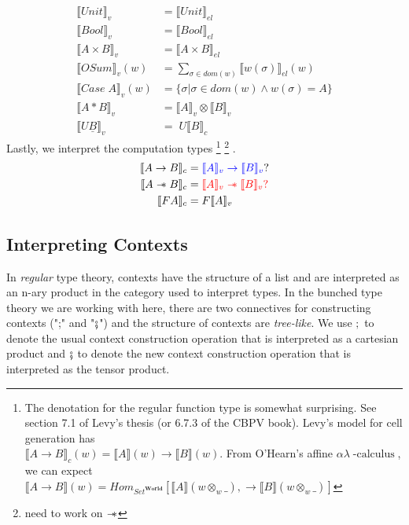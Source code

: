 \documentclass{article}
\newcommand{\blue}[1]{\textcolor{blue}{#1}}
\newcommand{\red}[1]{\textcolor{red}{#1}}
\newcommand{\sep}{\mathrel{-\mkern-6mu*}}
\newcommand{\world}{{\mathbf{World}}}
\newcommand{\calculus}{\operatorname{-calculus}}
\begin{document}
\begin{align*}
    \llbracket Unit \rrbracket_v &= \llbracket Unit \rrbracket_{el}\\
    \llbracket Bool \rrbracket_v &= \llbracket Bool \rrbracket_{el}\\
    \llbracket A \times B \rrbracket_v &= \llbracket A \times B \rrbracket_{el}\\
    \llbracket OSum \rrbracket_v (w)&= \sum_{\sigma \in dom(w)} \llbracket w(\sigma) \rrbracket_{el}(w)\\
    \llbracket Case \; A \rrbracket_v(w) &= \{ \sigma | \sigma \in dom(w) \land w(\sigma)= A \} \\
    \llbracket A * B \rrbracket_v &= \llbracket A \rrbracket_v \otimes \llbracket B \rrbracket_v \\
    \llbracket U  \underline{B} \rrbracket_v &= \; U \llbracket B \rrbracket_c 
\end{align*}
Lastly, we interpret the computation types
\footnote{The denotation for the regular function type is somewhat surprising. 
See section 7.1 of Levy's thesis (or 6.7.3 of the CBPV book). Levy's model for cell generation has \\
$\llbracket A \rightarrow B \rrbracket_c(w)= \llbracket A \rrbracket(w) \rightarrow\llbracket B \rrbracket(w)$.
From O'Hearn's affine $\alpha\lambda\calculus$, we can expect \\
$\llbracket A \rightarrow B \rrbracket(w)= Hom_{Set^{\world}}[ \llbracket A \rrbracket(w \otimes_w \_) ,
\rightarrow\llbracket B \rrbracket(w \otimes_w \_)]$}
\footnote{need to work on $\sep$}
.
\begin{align*}
    \llbracket A \rightarrow B \rrbracket_c &= \blue{\llbracket A \rrbracket_v \rightarrow\llbracket B \rrbracket_v}?\\
    \llbracket A \sep B \rrbracket_c &= \red{\llbracket A \rrbracket_v \sep \llbracket B \rrbracket_v?}\\
    \llbracket F A \rrbracket_c &= F\llbracket A \rrbracket_v\\
\end{align*}
\subsection{Interpreting Contexts}
In \textit{regular} type theory, contexts have the structure of a list and are interpreted as an n-ary product in the category used 
to interpret types. In the bunched type theory we are working with here, there are two connectives for constructing contexts 
(";" and "$\fatsemi$") and the structure of contexts are \textit{tree-like}. We use $;$ to denote the usual context construction operation 
that is interpreted as a cartesian product and $\fatsemi$ to denote the new context construction operation that is interpreted as the 
tensor product.
\end{document}
